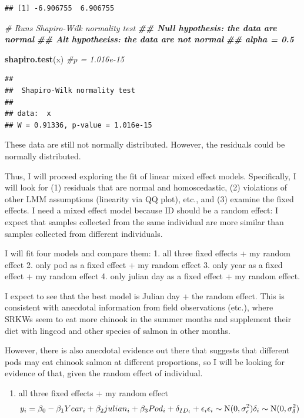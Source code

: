 \documentclass[
]{article}
\newenvironment{Shaded}{\begin{snugshade}}{\end{snugshade}}
\newcommand{\CommentTok}[1]{\textcolor[rgb]{0.56,0.35,0.01}{\textit{#1}}}
\newcommand{\DocumentationTok}[1]{\textcolor[rgb]{0.56,0.35,0.01}{\textbf{\textit{#1}}}}
\newcommand{\FunctionTok}[1]{\textcolor[rgb]{0.13,0.29,0.53}{\textbf{#1}}}
\newcommand{\NormalTok}[1]{#1}
\providecommand{\tightlist}{%
  \setlength{\itemsep}{0pt}\setlength{\parskip}{0pt}}
\begin{document}
\begin{verbatim}
## [1] -6.906755  6.906755
\end{verbatim}

\begin{Shaded}
\begin{Highlighting}[]
\CommentTok{\# Runs Shapiro{-}Wilk normality test}
\DocumentationTok{\#\# Null hypothesis: the data are normal}
\DocumentationTok{\#\# Alt hypotheeiss: the data are not normal}
\DocumentationTok{\#\# alpha = 0.5}

\FunctionTok{shapiro.test}\NormalTok{(x) }\CommentTok{\#p = 1.016e{-}15}
\end{Highlighting}
\end{Shaded}

\begin{verbatim}
## 
##  Shapiro-Wilk normality test
## 
## data:  x
## W = 0.91336, p-value = 1.016e-15
\end{verbatim}

These data are still not normally distributed. However, the residuals
could be normally distributed.

Thus, I will proceed exploring the fit of linear mixed effect models.
Specifically, I will look for (1) residuals that are normal and
homoscedastic, (2) violations of other LMM assumptions (linearity via QQ
plot), etc., and (3) examine the fixed effects. I need a mixed effect
model because ID should be a random effect: I expect that samples
collected from the same individual are more similar than samples
collected from different individuals.

I will fit four models and compare them: 1. all three fixed effects + my
random effect 2. only pod as a fixed effect + my random effect 3. only
year as a fixed effect + my random effect 4. only julian day as a fixed
effect + my random effect.

I expect to see that the best model is Julian day + the random effect.
This is consistent with anecdotal information from field observations
(etc.), where SRKWs seem to eat more chinook in the summer months and
supplement their diet with lingcod and other species of salmon in other
months.

However, there is also anecdotal evidence out there that suggests that
different pods may eat chinook salmon at different proportions, so I
will be looking for evidence of that, given the random effect of
individual.

\begin{enumerate}
\def\labelenumi{\arabic{enumi}.}
\tightlist
\item
  all three fixed effects + my random effect \[
  y_i = \beta_0 - \beta_1 Year_i + \beta_2 julian_i + \beta_3 Pod_i + \delta_{ID_i}+ \epsilon_i \\
  \epsilon_i \sim \text{N}(0, \sigma_\epsilon^2) \\
  \delta_{i} \sim \text{N}(0, \sigma_\delta^2) \\
  \]
\end{enumerate}
\end{document}

